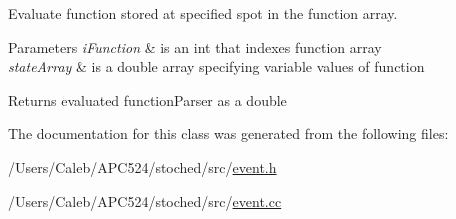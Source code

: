 Evaluate function stored at specified spot in the function array. 


\begin{DoxyParams}{Parameters}
{\em i\+Function} & is an int that indexes function array \\
\hline
{\em state\+Array} & is a double array specifying variable values of function \\
\hline
\end{DoxyParams}
\begin{DoxyReturn}{Returns}
evaluated function\+Parser as a double 
\end{DoxyReturn}


The documentation for this class was generated from the following files\+:\begin{DoxyCompactItemize}
\item 
/\+Users/\+Caleb/\+A\+P\+C524/stoched/src/\hyperlink{event_8h}{event.\+h}\item 
/\+Users/\+Caleb/\+A\+P\+C524/stoched/src/\hyperlink{event_8cc}{event.\+cc}\end{DoxyCompactItemize}
